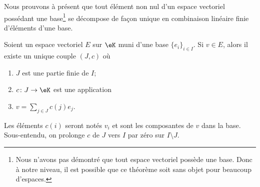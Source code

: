 Nous prouvons à présent que tout élément non nul d'un espace vectoriel possédant une base\footnote{Nous n'avons pas démontré que tout espace vectoriel possède une base. Donc à notre niveau, il est possible que ce théorème soit sans objet pour beaucoup d'espaces.} se décompose de façon unique en combinaison linéaire finie d'éléments d'une base.
\begin{proposition}      \label{PROPooEIQIooXfWDDV}
	Soient un espace vectoriel \( E\) sur \( \eK\) muni d'une base \( \{ e_i \}_{i\in I}\). Si \( v\in E\), alors il existe un unique couple \( (J, c)\) où
	\begin{enumerate}
		\item
		      \( J\) est une partie finie de \( I\);
		\item
		      \( c\colon J\to \eK\) est une application
		\item
		      \( v=\sum_{j\in J}c(j)e_j\).
	\end{enumerate}
	Les éléments \( c(i)\) seront notés \( v_i\) et sont les composantes de \( v\) dans la base. Sous-entendu, on prolonge \( c\) de \( J\)  vers \( I\) par zéro sur \( I\setminus J\).
\end{proposition}

